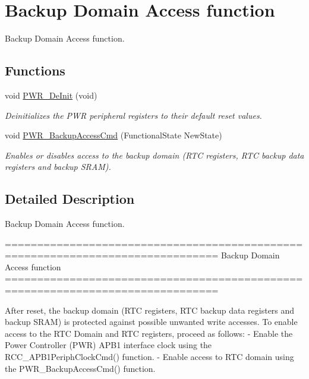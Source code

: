 \hypertarget{group___p_w_r___group1}{\section{Backup Domain Access function}
\label{group___p_w_r___group1}
}


Backup Domain Access function.  


\subsection*{Functions}
\begin{DoxyCompactItemize}
\item 
void \hyperlink{group___p_w_r___group1_gad03a0aac7bc3bc3a9fd012f3769a6990}{P\-W\-R\-\_\-\-De\-Init} (void)
\begin{DoxyCompactList}\small\item\em Deinitializes the P\-W\-R peripheral registers to their default reset values. \end{DoxyCompactList}\item 
void \hyperlink{group___p_w_r___group1_ga0741aea35572b1a75f82b74de12df800}{P\-W\-R\-\_\-\-Backup\-Access\-Cmd} (Functional\-State New\-State)
\begin{DoxyCompactList}\small\item\em Enables or disables access to the backup domain (R\-T\-C registers, R\-T\-C backup data registers and backup S\-R\-A\-M). \end{DoxyCompactList}\end{DoxyCompactItemize}


\subsection{Detailed Description}
Backup Domain Access function. \begin{DoxyVerb} ===============================================================================
                            Backup Domain Access function 
 ===============================================================================  

  After reset, the backup domain (RTC registers, RTC backup data 
  registers and backup SRAM) is protected against possible unwanted 
  write accesses. 
  To enable access to the RTC Domain and RTC registers, proceed as follows:
    - Enable the Power Controller (PWR) APB1 interface clock using the
      RCC_APB1PeriphClockCmd() function.
    - Enable access to RTC domain using the PWR_BackupAccessCmd() function.\end{DoxyVerb}
 

